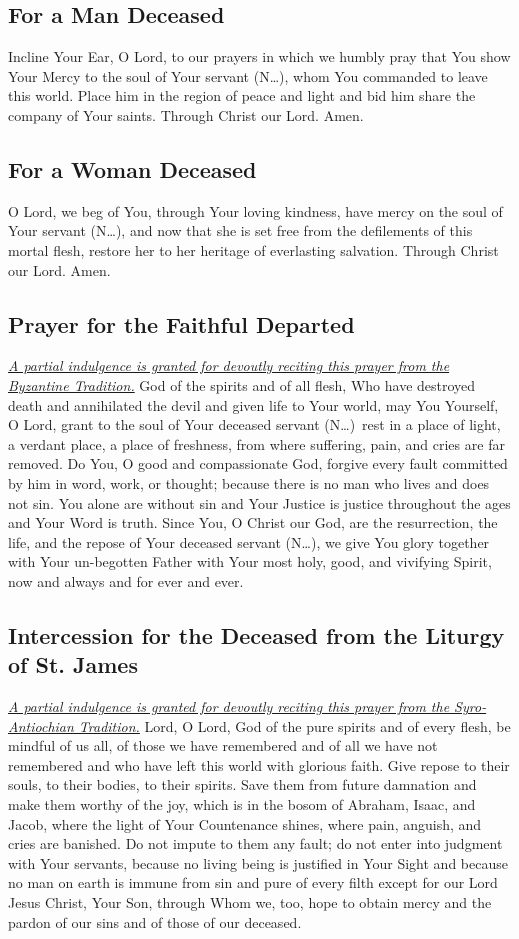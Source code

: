 \documentclass[12pt]{article}
\newcommand{\prayertitle}[1]{\subsection{#1}}
\newcommand{\indulgencedprayertitle}[1]{\prayertitle{#1 \protect\kreuz}}
\newcommand{\insertname}{(N\dots)\xspace}
\newcommand{\emphasis}[1]{\emph{#1}}
\newcommand{\emphasis}[1]{\textsl{#1}}
\newcommand{\note}[1]{{\small{\emphasis{#1}}}\newline}
\newcommand{\linkednote}[2]{\hyperlink{#1}{\note{#2}}}
\begin{document}
\prayertitle{For a Man Deceased}
Incline Your Ear, O Lord, to our prayers in which we humbly pray that You show Your Mercy to the soul of Your servant \insertname, whom You commanded to leave this world.
Place him in the region of peace and light and bid him share the company of Your saints.
Through Christ our Lord. Amen.

\prayertitle{For a Woman Deceased}
O Lord, we beg of You, through Your loving kindness, have mercy on the soul of Your servant \insertname, and now that she is set free from the defilements of this mortal flesh, restore her to her heritage of everlasting salvation.
Through Christ our Lord. Amen.

\indulgencedprayertitle{Prayer for the Faithful Departed}
\linkednote{grant23}{A partial indulgence is granted for devoutly reciting this prayer from the Byzantine Tradition.}
God of the spirits and of all flesh, Who have destroyed death and annihilated the devil
and given life to Your world, may You Yourself, O Lord, grant to the soul of Your
deceased servant \insertname\ rest in a place of light, a verdant place, a place of freshness, from where suffering, pain, and cries are far removed.
Do You, O good and compassionate God, forgive every fault committed by him in word, work, or thought;
because there is no man who lives and does not sin.
You alone are without sin and Your Justice is justice throughout the ages and Your Word is truth.
Since You, O Christ our God, are the resurrection, the life, and the repose of Your
deceased servant \insertname, we give You glory together with Your un-begotten Father with
Your most holy, good, and vivifying Spirit, now and always and for ever and ever.

\indulgencedprayertitle{Intercession for the Deceased from the Liturgy of St. James}
\linkednote{grant23}{A partial indulgence is granted for devoutly reciting this prayer from the Syro-Antiochian Tradition.}
Lord, O Lord, God of the pure spirits and of every flesh, be mindful of us all, of those we have remembered and of all we have not remembered and who have left this world with glorious faith.
Give repose to their souls, to their bodies, to their spirits.
Save them from future damnation and make them worthy of the joy, which is in the bosom of Abraham, Isaac, and Jacob, where the light of Your Countenance shines, where pain, anguish, and cries are banished.
Do not impute to them any fault;
do not enter into judgment with Your servants, because no living being is justified in Your Sight and because no man on earth is immune from sin and pure of every filth except for our Lord Jesus Christ, Your Son, through Whom we, too, hope to obtain mercy and the pardon of our sins and of those of our deceased.
\end{document}
